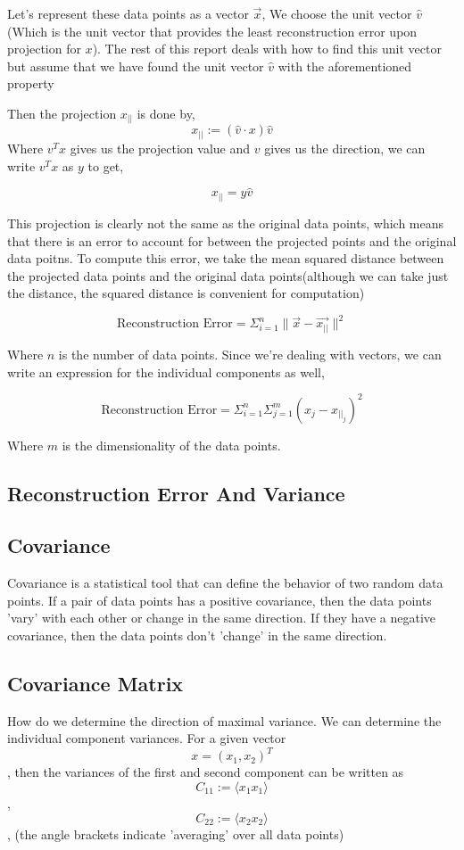 \documentclass[11pt]{article}
\begin{document}
Let's represent these data points as a vector \(\vec{x}\), We choose the unit vector \(\hat{v}\)(Which is the unit vector that provides the least reconstruction error upon projection for \(x\)). The rest of this report deals with how to find this unit vector but assume that we have found the unit vector \(\hat{v}\) with the aforementioned property

Then the projection \(x_{||}\) is done by,
$$x_{||} := (\hat{v} \cdot x) \hat{v}$$
Where \(v^Tx\) gives us the projection value and  \(v\) gives us the direction, we can write \(v^Tx\) as \(y\) to get,

$$x_{||} = y \hat{v} $$

This projection is clearly not the same as the original data points, which means that there is an error to account for between the projected points and the original data poitns. To compute this error, we take the mean squared distance between the projected data points and the original data points(although we can take just the distance, the squared distance is convenient for computation)

$$\text{Reconstruction Error} = \Sigma_{i = 1}^{n} \| \vec{x} - \vec{x_{||}} \|^{2}$$

Where \(n\) is the number of data points. Since we're dealing with vectors, we can write an expression for the individual components as well,

$$\text{Reconstruction Error} = \Sigma_{i = 1}^{n} \Sigma_{j=1}^{m}(x_{j} - x_{||_{j}})^{2}$$

Where \(m\) is the dimensionality of the data points.
\subsection{Reconstruction Error And Variance}
\label{sec:org86ad0c4}
\subsection{Covariance}
\label{sec:org0d9ff55}
Covariance is a statistical tool that can define the behavior of two random data points. If a pair of data points has a positive covariance, then the data points 'vary' with each other or change in the same direction. If they have a negative covariance, then the data points don't 'change' in the same direction.
\subsection{Covariance Matrix}
\label{sec:org619077d}
How do we determine the direction of maximal variance. We can determine the individual component variances. For a given vector $$x=(x_1, x_2)^T$$, then the variances of the first and second component can be written as $$C_{11} := \langle x_1 x_1\rangle$$ ,$$C_{22} := \langle x_2 x_2\rangle$$, (the angle brackets indicate 'averaging' over all data points)
\end{document}
